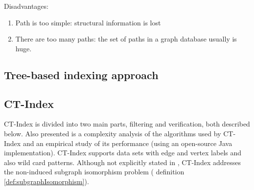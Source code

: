 \documentclass{l4proj}
\begin{document}
        Disadvantages:
        \begin{enumerate}
            \item Path is too simple: structural information is lost
            \item There are too many paths: the set of paths in a graph database usually is huge.
        \end{enumerate}
        \subsection{Tree-based indexing approach}
        
\subsection{CT-Index}
\label{sec:ctindex}

%
%
%
CT-Index \cite{ctindex} is divided into two main parts, filtering and verification, both described below. Also presented is a complexity analysis of the algorithms used by CT-Index and an empirical study of its performance (using an open-source Java implementation).
CT-Index supports data sets with edge and vertex labels and also wild card patterns. Although not explicitly stated in \cite{ctindex}, CT-Index addresses the non-induced subgraph isomorphism problem  ( definition \ref{def:subgraphIsomorphism}).
\end{document}
